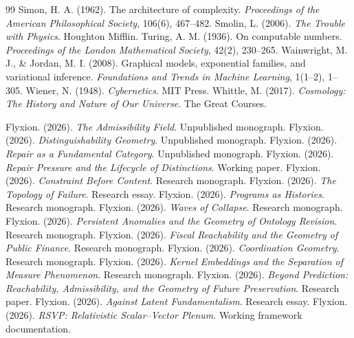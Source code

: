 \documentclass[11pt, oneside]{book}
\theoremstyle{definition}
\theoremstyle{remark}
\begin{document}
\begin{thebibliography}{99}
 Simon, H. A. (1962). The architecture of complexity. \textit{Proceedings of the American Philosophical Society}, 106(6), 467--482.
 Smolin, L. (2006). \textit{The Trouble with Physics}. Houghton Mifflin.
 Turing, A. M. (1936). On computable numbers. \textit{Proceedings of the London Mathematical Society}, 42(2), 230--265.
 Wainwright, M. J., \& Jordan, M. I. (2008). Graphical models, exponential families, and variational inference. \textit{Foundations and Trends in Machine Learning}, 1(1--2), 1--305.
 Wiener, N. (1948). \textit{Cybernetics}. MIT Press.
 Whittle, M. (2017). \textit{Cosmology: The History and Nature of Our Universe}. The Great Courses.

 Flyxion. (2026). \textit{The Admissibility Field}. Unpublished monograph.
 Flyxion. (2026). \textit{Distinguishability Geometry}. Unpublished monograph.
 Flyxion. (2026). \textit{Repair as a Fundamental Category}. Unpublished monograph.
 Flyxion. (2026). \textit{Repair Pressure and the Lifecycle of Distinctions}. Working paper.
 Flyxion. (2026). \textit{Constraint Before Content}. Research monograph.
 Flyxion. (2026). \textit{The Topology of Failure}. Research essay.
 Flyxion. (2026). \textit{Programs as Histories}. Research monograph.
 Flyxion. (2026). \textit{Waves of Collapse}. Research monograph.
 Flyxion. (2026). \textit{Persistent Anomalies and the Geometry of Ontology Revision}. Research monograph.
 Flyxion. (2026). \textit{Fiscal Reachability and the Geometry of Public Finance}. Research monograph.
 Flyxion. (2026). \textit{Coordination Geometry}. Research monograph.
 Flyxion. (2026). \textit{Kernel Embeddings and the Separation of Measure Phenomenon}. Research monograph.
 Flyxion. (2026). \textit{Beyond Prediction: Reachability, Admissibility, and the Geometry of Future Preservation}. Research paper.
 Flyxion. (2026). \textit{Against Latent Fundamentalism}. Research essay.
 Flyxion. (2026). \textit{RSVP: Relativistic Scalar--Vector Plenum}. Working framework documentation.

\end{thebibliography}
\end{document}
